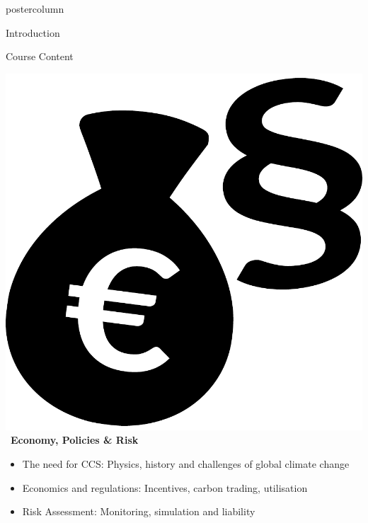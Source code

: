 \documentclass{beamer}
\begin{document}
\begin{frame}
\begin{columns}
\begin{column}{.382\textwidth}
\begin{beamercolorbox}[center]{postercolumn}
\begin{minipage}{.98\textwidth}
{\begin{myblock}{Introduction}
\end{myblock}\vfill
					
					
					
					
\begin{myblock}{Course Content}

	\includegraphics[scale=0.1]{figures/icons/eco_law}~\textbf{Economy, Policies \& Risk}
	\begin{itemize}
		\item The need for CCS: Physics, history and challenges of global climate change
		\item Economics and regulations: Incentives, carbon trading,  utilisation
		\item Risk Assessment: Monitoring, simulation and liability
	\end{itemize}
	\vspace{0.5em}
						
	


\end{myblock}}
\end{minipage}
\end{beamercolorbox}
\end{column}
\end{columns}
\end{frame}
\end{document}
